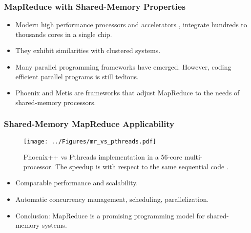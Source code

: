 \begin{frame}
	\frametitle{MapReduce with Shared-Memory Properties}
	\begin{itemize}
		\item Modern high performance processors and accelerators , integrate hundreds to thousands cores in a single chip.
		\item They exhibit similarities with clustered systems.
		\item Many parallel programming frameworks have emerged. However, coding efficient parallel programs is still tedious.
		\item Phoenix  and Metis  are frameworks that adjust MapReduce to the needs of shared-memory processors.
	\end{itemize}
\end{frame}

\begin{frame}
	\frametitle{Shared-Memory MapReduce Applicability}
	\vspace{-10pt}
	\begin{figure}[h]
		\texttt{[image: ../Figures/mr\_vs\_pthreads.pdf]}
		\caption*{Phoenix++  vs Pthreads implementation in a 56-core multi-processor. The speedup is with respect to the same sequential code .}
	\end{figure}
	\vspace{-15pt}
	\begin{itemize}
		\item Comparable performance and scalability.
		\item Automatic concurrency management, scheduling, parallelization.
		\item Conclusion: MapReduce is a promising programming model for shared-memory systems.
	\end{itemize}
\end{frame}

